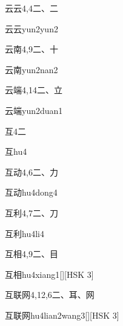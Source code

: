 \begin{entry}{云云}{4,4}{⼆、⼆}
  \begin{phonetics}{云云}{yun2yun2}
  \end{phonetics}
\end{entry}

\begin{entry}{云南}{4,9}{⼆、⼗}
  \begin{phonetics}{云南}{yun2nan2}
  \end{phonetics}
\end{entry}

\begin{entry}{云端}{4,14}{⼆、⽴}
  \begin{phonetics}{云端}{yun2duan1}
  \end{phonetics}
\end{entry}

\begin{entry}{互}{4}{⼆}
  \begin{phonetics}{互}{hu4}
  \end{phonetics}
\end{entry}

\begin{entry}{互动}{4,6}{⼆、⼒}
  \begin{phonetics}{互动}{hu4dong4}
  \end{phonetics}
\end{entry}

\begin{entry}{互利}{4,7}{⼆、⼑}
  \begin{phonetics}{互利}{hu4li4}
  \end{phonetics}
\end{entry}

\begin{entry}{互相}{4,9}{⼆、⽬}
  \begin{phonetics}{互相}{hu4xiang1}[][HSK 3]
  \end{phonetics}
\end{entry}

\begin{entry}{互联网}{4,12,6}{⼆、⽿、⽹}
  \begin{phonetics}{互联网}{hu4lian2wang3}[][HSK 3]
  \end{phonetics}
\end{entry}

